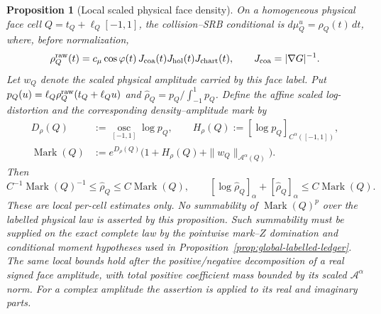 \documentclass[11pt]{article}
\newtheorem{proposition}[theorem]{Proposition}
\begin{document}
\begin{proposition}[Local scaled physical face density]
\label{prop:scaled-face-density}
On a homogeneous physical face cell
\(Q=t_Q+\ell_Q[-1,1]\), the collision--SRB conditional is
\(d\mu_Q^u=\rho_Q(t)\,dt\), where, before normalization,
\begin{equation}
\label{eq:face-conditional-density}
 \rho_Q^{\rm raw}(t)=c_\mu\cos\varphi(t)\,J_{\rm coa}(t)
 J_{\rm hol}(t)J_{\rm chart}(t),
 \qquad J_{\rm coa}=|\nabla G|^{-1}.
\end{equation}
Let $w_Q$ denote the scaled physical amplitude carried by this face label.
Put \(p_Q(u)=\ell_Q\rho_Q^{\rm raw}(t_Q+\ell_Qu)\) and
\(\widehat\rho_Q=p_Q/\int_{-1}^1p_Q\).  Define the affine scaled
log-distortion and the corresponding density--amplitude mark by
\begin{equation}
\label{eq:density-mark-definition}
 \begin{split}
 D_\rho(Q)&:=\operatorname*{osc}_{[-1,1]}\log p_Q,
 \qquad H_\rho(Q):=[\log p_Q]_{C^\alpha([-1,1])},\\
 \operatorname{Mark}(Q)&:=
 e^{D_\rho(Q)}
 \bigl(1+H_\rho(Q)+\|w_Q\|_{\mathcal A^\alpha(Q)}\bigr).
 \end{split}
\end{equation}
Then
\begin{equation}
\label{eq:scaled-density-bound}
 C^{-1}\operatorname{Mark}(Q)^{-1}
 \le\widehat\rho_Q\le C\operatorname{Mark}(Q),\qquad
 [\log\widehat\rho_Q]_{\alpha}
 +[\widehat\rho_Q]_{\alpha}
 \le C\operatorname{Mark}(Q).
\end{equation}
These are local per-cell estimates only.  No summability of
$\operatorname{Mark}(Q)^p$ over the labelled physical law is asserted by this
proposition.  Such summability must be supplied on the exact complete law by
the pointwise mark--$Z$ domination and conditional moment hypotheses used in
Proposition~\ref{prop:global-labelled-ledger}.  The same local bounds hold
after the positive/negative decomposition of a real signed face amplitude,
with total positive coefficient mass bounded by its scaled
$\mathcal A^\alpha$ norm.  For a complex amplitude the assertion is applied
to its real and imaginary parts.
\end{proposition}
\end{document}
